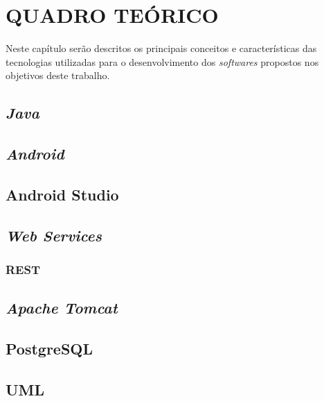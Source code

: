 \chapter{QUADRO TEÓRICO}

	\par Neste capítulo serão descritos os principais conceitos e características
das tecnologias utilizadas para o desenvolvimento dos \textit{softwares}
propostos nos objetivos deste trabalho.
	
	\section{\textit{Java}}
		

	\section{\textit{Android}}
		
	
	\section{Android Studio}
		
	
	\section{\textit{Web Services}}
		
			\subsection{REST}
				
	\section{\textit{Apache Tomcat}}
		
	
	\section{PostgreSQL}
		
	
	\section{UML}
		
	
